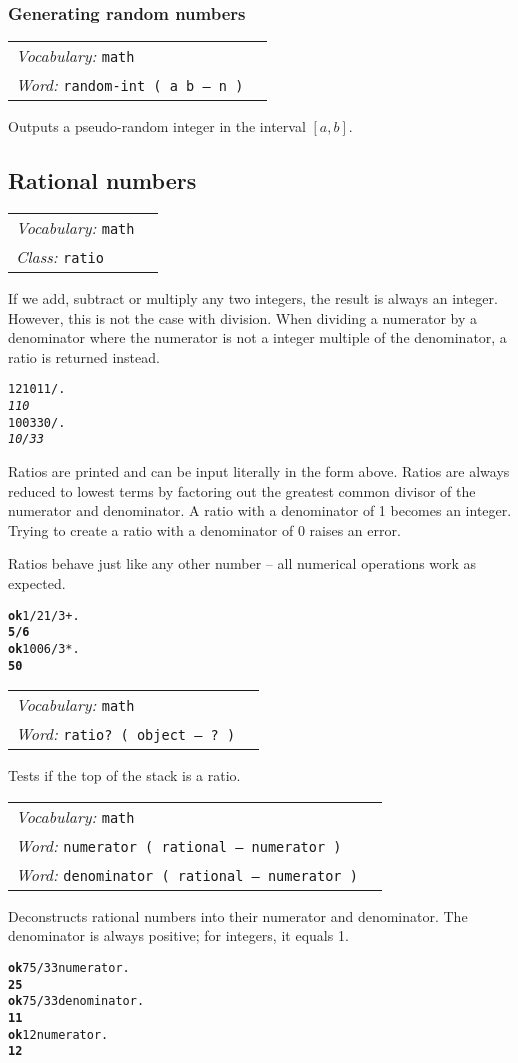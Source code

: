 \documentclass{book}
\newcommand{\vocabulary}[1]{\emph{Vocabulary:} \texttt{#1}&\\}
\newcommand{\ordinaryword}[2]{\index{\texttt{#1}}\emph{Word:} \texttt{#2}&\\}
\newcommand{\classword}[1]{\index{\texttt{#1}}\emph{Class:} \texttt{#1}&\\}
\newcommand{\predword}[1]{\ordinaryword{#1}{#1~( object -- ?~)}}
\newcommand{\wordtable}[1]{


\begin{tabularx}{12cm}{lX}
\hline
#1
\hline
\end{tabularx}

}
\begin{document}
\subsubsection{Generating random numbers}

\wordtable{
\vocabulary{math}
\ordinaryword{random-int}{random-int ( a b -- n )}
}
Outputs a pseudo-random integer in the interval $[a,b]$.

\subsection{\label{ratios}Rational numbers}

\newcommand{\rationalglos}{}
\rationalglos
\ratioglos

\wordtable{
\vocabulary{math}
\classword{ratio}
}
If we add, subtract or multiply any two integers, the result is always an integer. However, this is not the case with division. When dividing a numerator by a denominator where the numerator is not a integer multiple of the denominator, a ratio is returned instead.
\begin{alltt}
1210 11 / .
\emph{110}
100 330 / .
\emph{10/33}
\end{alltt}
Ratios are printed and can be input literally in the form above. Ratios are always reduced to lowest terms by factoring out the greatest common divisor of the numerator and denominator. A ratio with a denominator of 1 becomes an integer. Trying to create a ratio with a denominator of 0 raises an error.

Ratios behave just like any other number -- all numerical operations work as expected.
\begin{alltt}
\textbf{ok} 1/2 1/3 + .
\textbf{5/6}
\textbf{ok} 100 6 / 3 * .
\textbf{50}
\end{alltt}
\wordtable{
\vocabulary{math}
\predword{ratio?}
}
Tests if the top of the stack is a ratio.
\wordtable{
\vocabulary{math}
\ordinaryword{numerator}{numerator ( rational -- numerator )}
\ordinaryword{denominator}{denominator ( rational -- numerator )}
}
Deconstructs rational numbers into their numerator and denominator. The denominator is always positive; for integers, it equals 1.
\begin{alltt}
\textbf{ok} 75/33 numerator .
\textbf{25}
\textbf{ok} 75/33 denominator .
\textbf{11}
\textbf{ok} 12 numerator .
\textbf{12}
\end{alltt}
\end{document}
